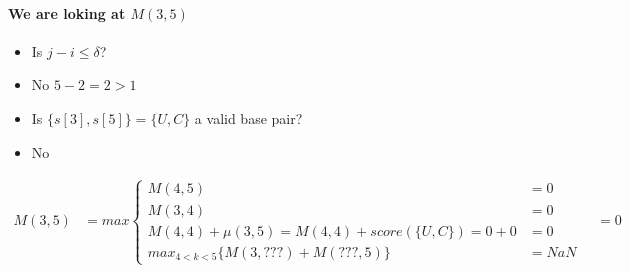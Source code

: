 \paragraph{We are loking at $M(3,5)$}
\begin{itemize}
    \item[] Is $j-i \leq \delta$?
    \item[$\rightarrow$]  No $5-2 = 2 > 1$
    \item[] Is $\{s[3], s[5]\} = \{U, C\}$ a valid base pair?
    \item[$\rightarrow$]  No
\end{itemize}

\begin{align*}
    M(3,5) & = max \begin{cases}
                       M(4,5) & = 0 \\ %
                       M(3,4) & = 0 \\ %
                       M(4,4) + \mu(3,5) = M(4,4) + score(\{U, C\}) = 0 + 0 & = 0 \\ %
                       max_{4 < k < 5} \{ M(3, ???) + M( ???, 5) \} & = NaN
    \end{cases} \quad =  0
\end{align*}



